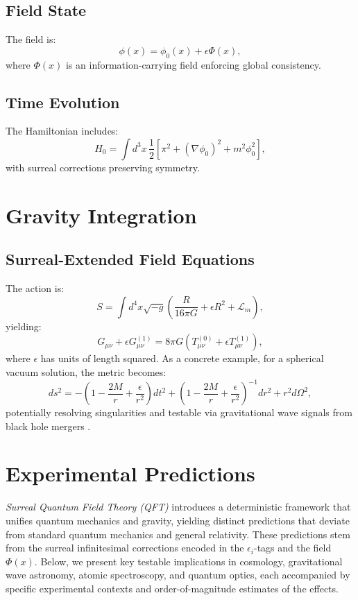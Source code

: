 \documentclass{article}
\begin{document}
\subsection{Field State}
The field is:
\begin{equation}
\phi(x) = \phi_0(x) + \epsilon \Phi(x),
\end{equation}
where \(\Phi(x)\) is an information-carrying field enforcing global consistency.

\subsection{Time Evolution}
The Hamiltonian includes:
\begin{equation}
H_0 = \int d^3x \, \frac{1}{2} [\pi^2 + (\nabla \phi_0)^2 + m^2 \phi_0^2],
\end{equation}
with surreal corrections preserving symmetry.

\section{Gravity Integration}
\subsection{Surreal-Extended Field Equations}
The action is:
\begin{equation}
S = \int d^4x \sqrt{-g} \left( \frac{R}{16\pi G} + \epsilon R^2 + \mathcal{L}_m \right),
\end{equation}
yielding:
\begin{equation}
G_{\mu\nu} + \epsilon G_{\mu\nu}^{(1)} = 8\pi G \left( T_{\mu\nu}^{(0)} + \epsilon T_{\mu\nu}^{(1)} \right),
\end{equation}
where \(\epsilon\) has units of length squared. As a concrete example, for a spherical vacuum solution, the metric becomes:
\begin{equation}
ds^2 = -\left(1 - \frac{2M}{r} + \frac{\epsilon}{r^2}\right) dt^2 + \left(1 - \frac{2M}{r} + \frac{\epsilon}{r^2}\right)^{-1} dr^2 + r^2 d\Omega^2,
\end{equation}
potentially resolving singularities and testable via gravitational wave signals from black hole mergers \cite{LIGO2016}.

\section{Experimental Predictions}
\textit{Surreal Quantum Field Theory (QFT)} introduces a deterministic framework that unifies quantum mechanics and gravity, yielding distinct predictions that deviate from standard quantum mechanics and general relativity. These predictions stem from the surreal infinitesimal corrections encoded in the \(\epsilon_i\)-tags and the field \(\Phi(x)\). Below, we present key testable implications in cosmology, gravitational wave astronomy, atomic spectroscopy, and quantum optics, each accompanied by specific experimental contexts and order-of-magnitude estimates of the effects.
\end{document}
